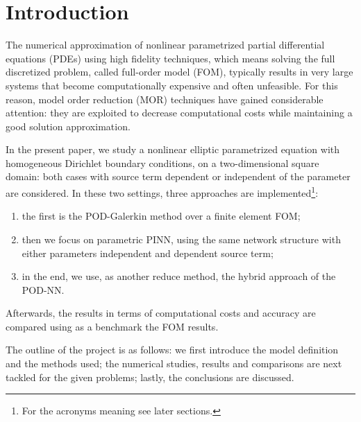 \documentclass[
    conference,
    nofonttune,
    11pt
]{IEEEtran}
\begin{document}

    
    \section{Introduction}\label{secIntroduction}

        The numerical approximation of nonlinear parametrized partial differential equations (PDEs) using high fidelity techniques, which means solving the full discretized problem, called full-order model (FOM), typically results in very large systems that become computationally expensive and often unfeasible. For this reason, model order reduction (MOR) techniques have gained considerable attention: they are exploited to decrease computational costs while maintaining a good solution approximation.
        
        In the present paper, we study a nonlinear elliptic parametrized equation with homogeneous Dirichlet boundary conditions, on a two-dimensional square domain: both cases with source term dependent or independent of the parameter are considered. In these two settings, three approaches are implemented\footnote{For the acronyms meaning see later sections.}:

        \begin{enumerate}%
            \item the first is the POD-Galerkin method over a finite element FOM;
            \item then we focus on parametric PINN, using the same network structure with either parameters independent and dependent source term;
            \item in the end, we use, as another reduce method, the hybrid approach of the POD-NN.
        \end{enumerate}

        Afterwards, the results in terms of computational costs and accuracy are compared using as a benchmark the FOM results. 
        
        The outline of the project is as follows: we first introduce the model definition and the methods used; the numerical studies, results and comparisons are next tackled for the given problems; lastly, the conclusions are discussed.
\end{document}
